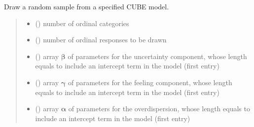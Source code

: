 \documentclass[letterpaper,10pt,english]{sphinxmanual}
\begin{document}
\begin{fulllineitems}
\label{\detokenize{cubmods:cubmods.cube_ywz.draw}}
\pysigstartsignatures
{}
\pysigstopsignatures
\sphinxAtStartPar
Draw a random sample from a specified CUBE model.
\begin{quote}\begin{description}
\begin{itemize}
\item {} 
\sphinxAtStartPar
{} () \textendash{} number of ordinal categories

\item {} 
\sphinxAtStartPar
{} () \textendash{} number of ordinal responses to be drawn

\item {} 
\sphinxAtStartPar
{} () \textendash{} array \(\pmb \beta\) of parameters for the uncertainty component, whose length equals 
 to include an intercept term in the model (first entry)

\item {} 
\sphinxAtStartPar
{} () \textendash{} array \(\pmb \gamma\) of parameters for the feeling component, whose length equals 
 to include an intercept term in the model (first entry)

\item {} 
\sphinxAtStartPar
{} () \textendash{} array \(\pmb \alpha\) of parameters for the overdispersion, whose length equals 
 to include an intercept term in the model (first entry)


\end{itemize}
\end{description}
\end{quote}
\end{fulllineitems}
\end{document}
